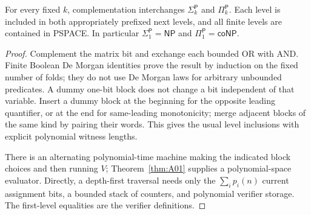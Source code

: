 \begin{theorem}\label{thm:A02}
For every fixed $k$, complementation interchanges $\Sigma_k^{\mathsf P}$ and $\Pi_k^{\mathsf P}$. Each level is included in both appropriately prefixed next levels, and all finite levels are contained in PSPACE. In particular $\Sigma_1^{\mathsf P}=\mathsf{NP}$ and $\Pi_1^{\mathsf P}=\mathsf{coNP}$.
\end{theorem}
\begin{proof}
Complement the matrix bit and exchange each bounded OR with AND. Finite Boolean De Morgan identities prove the result by induction on the fixed number of folds; they do not use De Morgan laws for arbitrary unbounded predicates. A dummy one-bit block does not change a bit independent of that variable. Insert a dummy block at the beginning for the opposite leading quantifier, or at the end for same-leading monotonicity; merge adjacent blocks of the same kind by pairing their words. This gives the usual level inclusions with explicit polynomial witness lengths.

There is an alternating polynomial-time machine making the indicated block choices and then running $V$; Theorem~\ref{thm:A01} supplies a polynomial-space evaluator. Directly, a depth-first traversal needs only the $\sum_i p_i(n)$ current assignment bits, a bounded stack of counters, and polynomial verifier storage. The first-level equalities are the verifier definitions.
\end{proof}

